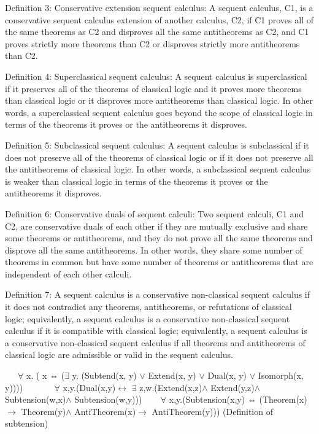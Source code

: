 Definition 3: Conservative extension sequent calculus:
A sequent calculus, C1, is a conservative sequent calculus extension of another calculus, C2, if C1 proves all of the same theorems as C2 and disproves all the same antitheorems as C2, and C1 proves strictly more theorems than C2 or disproves strictly more antitheorems than C2.

Definition 4: Superclassical sequent calculus:
A sequent calculus is superclassical if it preserves all of the theorems of classical logic and it proves more theorems than classical logic or it disproves more antitheorems than classical logic. In other words, a superclassical sequent calculus goes beyond the scope of classical logic in terms of the theorems it proves or the antitheorems it disproves.

Definition 5: Subclassical sequent calculus:
A sequent calculus is subclassical if it does not preserve all of the theorems of classical logic or if it does not preserve all the antitheorems of classical logic. In other words, a subclassical sequent calculus is weaker than classical logic in terms of the theorems it proves or the antitheorems it disproves.

Definition 6: Conservative duals of sequent calculi:
Two sequent calculi, C1 and C2, are conservative duals of each other if they are mutually exclusive and share some theorems or antitheorems, and they do not prove all the same theorems and disprove all the same antitheorems. In other words, they share some number of theorems in common but have some number of theorems or antitheorems that are independent of each other calculi.

Definition 7: A sequent calculus is a conservative non-classical sequent calculus if it does not contradict any theorems, antitheorems, or refutations of classical logic; equivalently, a sequent calculus is a conservative non-classical sequent calculus if it is compatible with classical logic; equivalently, a sequent calculus is a conservative non-classical sequent calculus if all theorems and antitheorems of classical logic are admissible or valid in the sequent calculus.

   $\forall$ x. ( x ⇔ ($\exists$ y. (Subtend(x, y) $\lor$  Extend(x, y) $\lor$  Dual(x, y) $\lor$  Isomorph(x, y))))
   
   $\forall$ x,y.(Dual(x,y)$\leftrightarrow$ $\exists$ z,w.(Extend(x,z)$\land$ Extend(y,z)$\land$ Subtension(w,x)$\land$ Subtension(w,y)))
   
$\forall$ x,y.(Subtension(x,y) ⇔ (Theorem(x)$\to$ Theorem(y)$\land$ AntiTheorem(x)$\to$ AntiTheorem(y))) (Definition of subtension)

